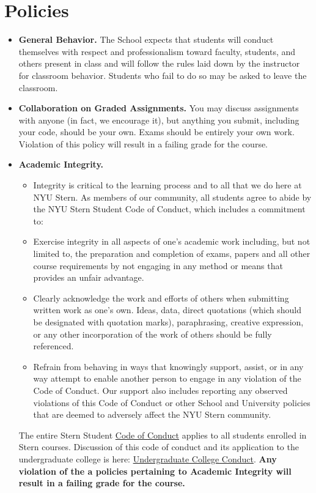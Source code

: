 \section*{Policies}

\begin{itemize}
\item \textbf{General Behavior.} The School expects that students will conduct themselves with respect and professionalism toward faculty, students, and others present in class and will follow the rules laid down by the instructor for classroom behavior.  Students who fail to do so may be asked to leave the classroom.

\item \textbf{Collaboration on Graded Assignments.} You may discuss assignments with anyone (in fact, we encourage it), but anything you submit, including your code, should be your own. Exams should be entirely your own work. Violation of this policy will result in a failing grade for the course.

\item \textbf{Academic Integrity.}
\begin{itemize}
\item Integrity is critical to the learning process and to all that we do here at NYU Stern. As members of our community, all students agree to abide by the NYU Stern Student Code of Conduct, which includes a commitment to:
\item Exercise integrity in all aspects of one's academic work including, but not limited to, the preparation and completion of exams, papers and all other course requirements by not engaging in any method or means that provides an unfair advantage.
\item Clearly acknowledge the work and efforts of others when submitting written work as one's own. Ideas, data, direct quotations (which should be designated with quotation marks), paraphrasing, creative expression, or any other incorporation of the work of others should be fully referenced.
\item Refrain from behaving in ways that knowingly support, assist, or in any way attempt to enable another person to engage in any violation of the Code of Conduct. Our support also includes reporting any observed violations of this Code of Conduct or other School and University policies that are deemed to adversely affect the NYU Stern community.
\end{itemize}
The entire Stern Student \href{http://www.stern.nyu.edu/sites/default/files/assets/documents/con_039512.pdf}{Code of Conduct} applies to all students enrolled in Stern courses. Discussion of this code of conduct and its application to the undergraduate college is here: \href{http://www.stern.nyu.edu/uc/codeofconduct}{Undergraduate College Conduct}. \textbf{Any violation of the a policies pertaining to Academic Integrity will result in a failing grade for the course.}
\end{itemize}

